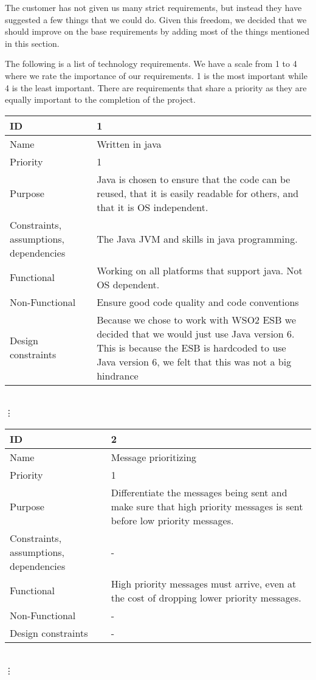    The customer has not given us many strict requirements, but instead they have suggested a few things that we could do. Given this freedom, we decided that we should improve on the base requirements by adding most of the things mentioned in this section. 

    The following is a list of technology requirements. We have a scale from 1 to 4 where we rate the importance of our requirements. 1 is the most important while 4 is the least important. There are requirements that share a priority as they are equally important to the completion of the project. 

\begin{tabular}{| p{4cm} | p{8cm} |}
    \hline
    ID & 1 \\
    \hline
    Name & Written in java  \\
    \hline
    Priority & 1 \\
    \hline
    Purpose & Java is chosen to ensure that the code can be reused, that it is easily readable for others, and that it is OS independent. \\
    \hline 
    Constraints, assumptions, dependencies & The Java JVM and skills in java programming. \\
    \hline  
    Functional & Working on all platforms that support java. Not OS dependent. \\
    \hline
    Non-Functional & Ensure good code quality and code conventions \\ 
    \hline
    Design constraints & Because we chose to work with WSO2 ESB we decided that we would just use Java version 6. This is because the ESB is hardcoded to use Java version 6, we felt that this was not a big hindrance  \\
    \hline
\end{tabular}
\\  \vdots  \\

\begin{tabular}{| p{4cm} | p{8cm} |}
    \hline
    ID & 2 \\
    \hline
    Name & Message prioritizing \\
    \hline
    Priority & 1 \\
    \hline
    Purpose & Differentiate the messages being sent and make sure that high priority messages is sent before low priority messages. \\
    \hline 
    Constraints, assumptions, dependencies & -\\
    \hline  
    Functional & High priority messages must arrive, even at the cost of dropping lower priority messages.  \\
    \hline
    Non-Functional & - \\ 
    \hline
    Design constraints & - \\
    \hline
\end{tabular}
\\  \vdots  \\

